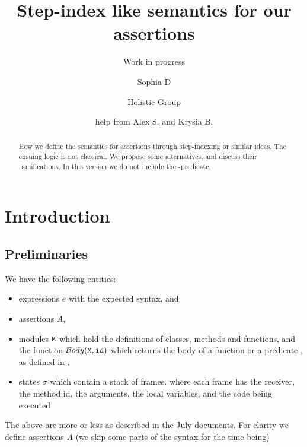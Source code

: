 \documentclass[acmsmall,screen]{acmart}
\begin{document}

\author{Sophia D} \author{Holistic Group} \author{help from Alex S. and Krysia B.} 




\title{Step-index like semantics for our assertions}
\subtitle{Work in progress}


\begin{abstract}

How we define the semantics for assertions through step-indexing or similar ideas. The ensuing logic is not classical.
We propose some alternatives, and discuss their ramifications.
In this version we do not include the \obeys-predicate.
\end{abstract}


\maketitle


\section{Introduction}

\subsection{Preliminaries}

We have the following entities:
\begin{itemize}
\item expressions $e$ with the expected syntax, and
\item assertions $A$,
\item modules ${\mbox{\tt{M}}}$ which hold the  definitions of classes, methods and functions, and the function $\mathcal{B}ody({\mbox{\tt{M}}},{\mbox{\tt{{\mbox{\tt{id}}}}}})$ which returns the body of a function or a predicate , as defined in \M.
\item states $\sigma$ which contain a stack of frames. where each frame has the receiver, the method id, the arguments, the local variables, and the code being executed
\end{itemize}

The above are more or less as described in the July documents. For clarity we define assertions $A$  (we skip some parts of the syntax for the time being)
\end{document}
